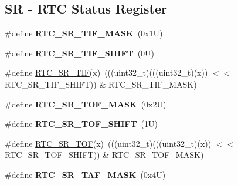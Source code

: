 \subsection*{SR -\/ R\+TC Status Register}
\begin{DoxyCompactItemize}
\item 
\mbox{\label{group___r_t_c___register___masks_ga1efc73171f80fa079f4d3aec43f2faab}} 
\#define {\bfseries R\+T\+C\+\_\+\+S\+R\+\_\+\+T\+I\+F\+\_\+\+M\+A\+SK}~(0x1\+U)
\item 
\mbox{\label{group___r_t_c___register___masks_ga261718ed362a6c56ad4c0e1c5e624552}} 
\#define {\bfseries R\+T\+C\+\_\+\+S\+R\+\_\+\+T\+I\+F\+\_\+\+S\+H\+I\+FT}~(0\+U)
\item 
\#define \mbox{\hyperlink{group___r_t_c___register___masks_gab119307a38d942f76aa92ff953520ff7}{R\+T\+C\+\_\+\+S\+R\+\_\+\+T\+IF}}(x)~(((uint32\+\_\+t)(((uint32\+\_\+t)(x)) $<$$<$ R\+T\+C\+\_\+\+S\+R\+\_\+\+T\+I\+F\+\_\+\+S\+H\+I\+FT)) \& R\+T\+C\+\_\+\+S\+R\+\_\+\+T\+I\+F\+\_\+\+M\+A\+SK)
\item 
\mbox{\label{group___r_t_c___register___masks_gabadca56816c485ca12134cd54a40c010}} 
\#define {\bfseries R\+T\+C\+\_\+\+S\+R\+\_\+\+T\+O\+F\+\_\+\+M\+A\+SK}~(0x2\+U)
\item 
\mbox{\label{group___r_t_c___register___masks_ga209c228a9376a460fa905e67716ebe65}} 
\#define {\bfseries R\+T\+C\+\_\+\+S\+R\+\_\+\+T\+O\+F\+\_\+\+S\+H\+I\+FT}~(1\+U)
\item 
\#define \mbox{\hyperlink{group___r_t_c___register___masks_gad807b2dce6068d9e34b9403f3a213681}{R\+T\+C\+\_\+\+S\+R\+\_\+\+T\+OF}}(x)~(((uint32\+\_\+t)(((uint32\+\_\+t)(x)) $<$$<$ R\+T\+C\+\_\+\+S\+R\+\_\+\+T\+O\+F\+\_\+\+S\+H\+I\+FT)) \& R\+T\+C\+\_\+\+S\+R\+\_\+\+T\+O\+F\+\_\+\+M\+A\+SK)
\item 
\mbox{\label{group___r_t_c___register___masks_ga8deec41a2823788375ed7b8b63870868}} 
\#define {\bfseries R\+T\+C\+\_\+\+S\+R\+\_\+\+T\+A\+F\+\_\+\+M\+A\+SK}~(0x4\+U)
\item 
\mbox{\label{group___r_t_c___register___masks_gaaae3f647015906bacdb13124a50d3cfb}} 

\end{DoxyCompactItemize}
